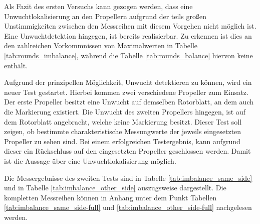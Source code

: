 Als Fazit des ersten Versuchs kann gezogen werden, dass eine Unwuchtlokalisierung an den Propellern aufgrund der teils großen Unstimmigkeiten zwischen den Messreihen mit diesem Vorgehen nicht möglich ist.
Eine Unwuchtdetektion hingegen, ist bereits realisierbar.
Zu erkennen ist dies an den zahlreichen Vorkommnissen von Maximalwerten in Tabelle \ref{tab:rounds_imbalance}, während die Tabelle \ref{tab:rounds_balance} hiervon keine enthält.

Aufgrund der prinzipellen Möglichkeit, Unwucht detektieren zu können, wird ein neuer Test gestartet.
Hierbei kommen zwei verschiedene Propeller zum Einsatz.
Der erste Propeller besitzt eine Unwucht auf demselben Rotorblatt, an dem auch die Markierung existiert.
Die Unwucht des zweiten Propellers hingegen, ist auf dem Rotorblatt angebracht, welche keine Markierung besitzt.
Dieser Test soll zeigen, ob bestimmte charakteristische Messungwerte der jeweils eingesetzten Propeller zu sehen sind.
Bei einem erfolgreichen Testergebnis, kann aufgrund dieser ein Rückschluss auf den eingesetzten Propeller geschlossen werden.
Damit ist die Aussage über eine Unwuchtlokalisierung möglich.

Die Messergebnisse des zweiten Tests sind in Tabelle \ref{tab:imbalance_same_side} und in Tabelle \ref{tab:imbalance_other_side} auszugsweise dargestellt.
Die kompletten Messreihen können in Anhang unter dem Punkt Tabellen \ref{tab:imbalance_same_side-full} und \ref{tab:imbalance_other_side-full} nachgelesen werden.

\begin{table}[H]
\centering
{}
\caption{Messergebnisse mit Unwucht auf Seite mit Markierung}
\label{tab:imbalance_same_side}
\end{table}


